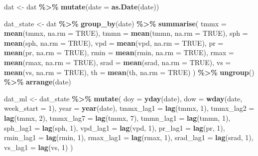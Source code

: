\documentclass[
]{article}
\newenvironment{Shaded}{\begin{snugshade}}{\end{snugshade}}
\newcommand{\AttributeTok}[1]{\textcolor[rgb]{0.13,0.29,0.53}{#1}}
\newcommand{\ConstantTok}[1]{\textcolor[rgb]{0.56,0.35,0.01}{#1}}
\newcommand{\DecValTok}[1]{\textcolor[rgb]{0.00,0.00,0.81}{#1}}
\newcommand{\FunctionTok}[1]{\textcolor[rgb]{0.13,0.29,0.53}{\textbf{#1}}}
\newcommand{\NormalTok}[1]{#1}
\newcommand{\OtherTok}[1]{\textcolor[rgb]{0.56,0.35,0.01}{#1}}
\newcommand{\SpecialCharTok}[1]{\textcolor[rgb]{0.81,0.36,0.00}{\textbf{#1}}}
\begin{document}
\begin{Shaded}
\begin{Highlighting}[]
\NormalTok{dat }\OtherTok{\textless{}{-}}\NormalTok{ dat }\SpecialCharTok{\%\textgreater{}\%}
\FunctionTok{mutate}\NormalTok{(}\AttributeTok{date =} \FunctionTok{as.Date}\NormalTok{(date))}

\NormalTok{dat\_state }\OtherTok{\textless{}{-}}\NormalTok{ dat }\SpecialCharTok{\%\textgreater{}\%}
\FunctionTok{group\_by}\NormalTok{(date) }\SpecialCharTok{\%\textgreater{}\%}
\FunctionTok{summarise}\NormalTok{(}
\AttributeTok{tmmx =} \FunctionTok{mean}\NormalTok{(tmmx, }\AttributeTok{na.rm =} \ConstantTok{TRUE}\NormalTok{),}
\AttributeTok{tmmn =} \FunctionTok{mean}\NormalTok{(tmmn, }\AttributeTok{na.rm =} \ConstantTok{TRUE}\NormalTok{),}
\AttributeTok{sph  =} \FunctionTok{mean}\NormalTok{(sph,  }\AttributeTok{na.rm =} \ConstantTok{TRUE}\NormalTok{),}
\AttributeTok{vpd  =} \FunctionTok{mean}\NormalTok{(vpd,  }\AttributeTok{na.rm =} \ConstantTok{TRUE}\NormalTok{),}
\AttributeTok{pr   =} \FunctionTok{mean}\NormalTok{(pr,   }\AttributeTok{na.rm =} \ConstantTok{TRUE}\NormalTok{),}
\AttributeTok{rmin =} \FunctionTok{mean}\NormalTok{(rmin, }\AttributeTok{na.rm =} \ConstantTok{TRUE}\NormalTok{),}
\AttributeTok{rmax =} \FunctionTok{mean}\NormalTok{(rmax, }\AttributeTok{na.rm =} \ConstantTok{TRUE}\NormalTok{),}
\AttributeTok{srad =} \FunctionTok{mean}\NormalTok{(srad, }\AttributeTok{na.rm =} \ConstantTok{TRUE}\NormalTok{),}
\AttributeTok{vs   =} \FunctionTok{mean}\NormalTok{(vs,   }\AttributeTok{na.rm =} \ConstantTok{TRUE}\NormalTok{),}
\AttributeTok{th   =} \FunctionTok{mean}\NormalTok{(th,   }\AttributeTok{na.rm =} \ConstantTok{TRUE}\NormalTok{)}
\NormalTok{) }\SpecialCharTok{\%\textgreater{}\%}
\FunctionTok{ungroup}\NormalTok{() }\SpecialCharTok{\%\textgreater{}\%}
\FunctionTok{arrange}\NormalTok{(date)}


\NormalTok{dat\_ml }\OtherTok{\textless{}{-}}\NormalTok{ dat\_state }\SpecialCharTok{\%\textgreater{}\%}
\FunctionTok{mutate}\NormalTok{(}
\AttributeTok{doy =} \FunctionTok{yday}\NormalTok{(date),}
\AttributeTok{dow =} \FunctionTok{wday}\NormalTok{(date, }\AttributeTok{week\_start =} \DecValTok{1}\NormalTok{),}
\AttributeTok{year =} \FunctionTok{year}\NormalTok{(date),}
\AttributeTok{tmmx\_lag1 =} \FunctionTok{lag}\NormalTok{(tmmx, }\DecValTok{1}\NormalTok{),}
\AttributeTok{tmmx\_lag2 =} \FunctionTok{lag}\NormalTok{(tmmx, }\DecValTok{2}\NormalTok{),}
\AttributeTok{tmmx\_lag7 =} \FunctionTok{lag}\NormalTok{(tmmx, }\DecValTok{7}\NormalTok{),}
\AttributeTok{tmmn\_lag1 =} \FunctionTok{lag}\NormalTok{(tmmn, }\DecValTok{1}\NormalTok{),}
\AttributeTok{sph\_lag1  =} \FunctionTok{lag}\NormalTok{(sph, }\DecValTok{1}\NormalTok{),}
\AttributeTok{vpd\_lag1  =} \FunctionTok{lag}\NormalTok{(vpd, }\DecValTok{1}\NormalTok{),}
\AttributeTok{pr\_lag1   =} \FunctionTok{lag}\NormalTok{(pr, }\DecValTok{1}\NormalTok{),}
\AttributeTok{rmin\_lag1 =} \FunctionTok{lag}\NormalTok{(rmin, }\DecValTok{1}\NormalTok{),}
\AttributeTok{rmax\_lag1 =} \FunctionTok{lag}\NormalTok{(rmax, }\DecValTok{1}\NormalTok{),}
\AttributeTok{srad\_lag1 =} \FunctionTok{lag}\NormalTok{(srad, }\DecValTok{1}\NormalTok{),}
\AttributeTok{vs\_lag1   =} \FunctionTok{lag}\NormalTok{(vs, }\DecValTok{1}\NormalTok{)}
\NormalTok{)}


\end{Highlighting}
\end{Shaded}
\end{document}
